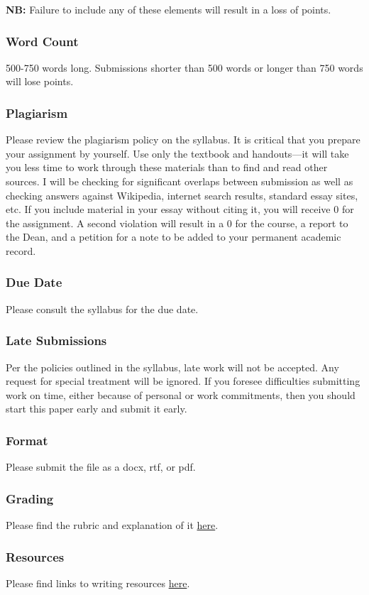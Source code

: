 \documentclass[]{article}
\begin{document}
\textbf{NB:} Failure to include any of these elements 
will result in a loss of points.

\subsubsection{Word Count}\label{word-count}

500-750 words long. Submissions shorter than 500 words or
longer than 750 words will lose points.


\subsubsection{Plagiarism}\label{plagiarism}

Please review the plagiarism policy on the syllabus. It is critical that
you prepare your assignment by yourself. Use only the textbook and
handouts---it will take you less time to work through these materials
than to find and read other sources. I will be checking for significant
overlaps between submission as well as checking answers against
Wikipedia, internet search results, standard essay sites, etc. If you
include material in your essay without citing it, you will receive 0 for
the assignment. A second violation will result in a 0 for the course, a
report to the Dean, and a petition for a note to be added to your
permanent academic record.

\subsubsection{Due Date}\label{due-date}

Please consult the syllabus for the due date.

\subsubsection{Late Submissions}\label{late-submissions}

Per the policies outlined in the syllabus, late work will not be
accepted. Any request for special treatment will be ignored. If you
foresee difficulties submitting work on time, either because of personal
or work commitments, then you should start this paper early and submit
it early.

\subsubsection{Format}\label{format}

Please submit the file as a docx, rtf, or pdf.

\subsubsection{Grading}\label{grading}

Please find the rubric and explanation of it
\href{/Teaching/Grading/}{here}.

\subsubsection{Resources}\label{resources}

Please find links to writing resources
\href{/Teaching/Resources/}{here}.
\end{document}
